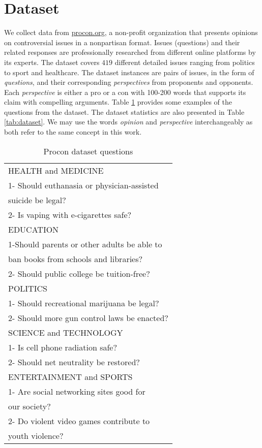 \documentclass[11pt,a4paper]{article}
\begin{document}
\section{Dataset}
We collect data from \url{procon.org}, a non-profit organization that presents opinions on controversial issues in a nonpartisan format. Issues (questions) and their related responses are professionally researched from different online platforms by its experts. The dataset covers $419$ different detailed issues ranging from politics to sport and healthcare. 
The dataset instances are pairs of issues, in the form of \textit{questions},  and their corresponding \textit{perspectives} from proponents and opponents. Each  \textit{perspective} is either a pro or a con with 100-200 words that supports its claim with compelling arguments. 
Table \ref{tab:examples} provides some examples of the questions from the dataset. The dataset statistics are also presented in Table  \ref{tab:dataset}. We may use the words \textit{opinion} and \textit{perspective} interchangeably as both refer to the same concept in this work.  


\begin{table}[t]
    \centering
    \begin{tabular}{|l|}
    \hline
    HEALTH and MEDICINE\\
    1- Should euthanasia or physician-assisted\\ suicide be    legal?\\
    2- Is vaping with e-cigarettes safe?\\
    \hline   
    EDUCATION\\
    
        1-Should parents or other adults be able to\\
        ban books from schools and libraries?\\
        2- Should public college be tuition-free?\\
        \hline
        POLITICS\\
        1- Should recreational marijuana be legal?\\
        2- Should more gun control laws be enacted?\\
        \hline
        SCIENCE and TECHNOLOGY\\
        1- Is cell phone radiation safe?\\
        2- Should net neutrality be restored?\\
        \hline
        ENTERTAINMENT and SPORTS\\
        1- Are social networking sites good for \\our society?\\
        2- Do violent video games contribute to\\ youth violence?\\
        \hline
    \end{tabular}
    \caption{Procon dataset questions}
    \label{tab:examples}
\end{table}
\end{document}
